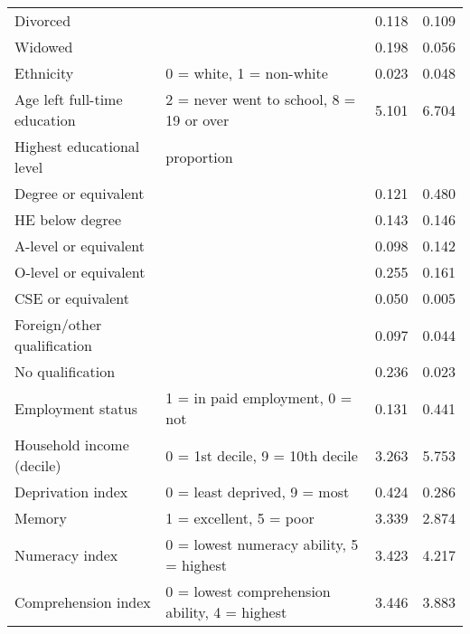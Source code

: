 \documentclass[12pt]{article}
\begin{document}
\begin{sidewaystable}[h!]
\begin{tabular}{llcc}
            \hspace{0.5cm} Divorced &  & 0.118 & 0.109 \\
            \hspace{0.5cm} Widowed &  & 0.198 & 0.056 \\
            Ethnicity & 0 = white, 1 = non-white & 0.023 & 0.048 \\
            Age left full-time education & 2 = never went to school, 8 = 19 or over & 5.101 & 6.704 \\
            Highest educational level & proportion & & \\
            \hspace{0.5cm} Degree or equivalent &  & 0.121 & 0.480 \\
            \hspace{0.5cm} HE below degree &  & 0.143 & 0.146 \\
            \hspace{0.5cm} A-level or equivalent &  & 0.098 & 0.142 \\
            \hspace{0.5cm} O-level or equivalent &  & 0.255 & 0.161 \\
            \hspace{0.5cm} CSE or equivalent &  & 0.050 & 0.005 \\
            \hspace{0.5cm} Foreign/other qualification &  & 0.097 & 0.044 \\
            \hspace{0.5cm} No qualification &  & 0.236 & 0.023 \\
            Employment status & 1 = in paid employment, 0 = not & 0.131 & 0.441 \\
            Household income (decile) & 0 = 1st decile, 9 = 10th decile & 3.263 & 5.753 \\
            Deprivation index & 0 = least deprived, 9 = most & 0.424 & 0.286 \\
            Memory & 1 = excellent, 5 = poor & 3.339 & 2.874 \\
            Numeracy index & 0 = lowest numeracy ability, 5 = highest & 3.423 & 4.217 \\
            Comprehension index & 0 = lowest comprehension ability, 4 = highest & 3.446 & 3.883 \\
            \bottomrule
        \end{tabular}
    \end{sidewaystable}
\end{document}
